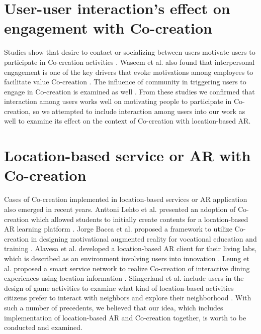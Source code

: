 \section{User-user interaction's effect on engagement with Co-creation}
Studies show that desire to contact or socializing between users motivate users to participate in Co-creation activities \cite{fernandes_remelhe_2016}\cite{engstrom_elg_2015}.
Waseem et al. also found that interpersonal engagement is one of the key drivers that evoke motivations among employees to facilitate value Co-creation \cite{waseem_biggemann_garry_2020}.
The influence of community in triggering users to engage in Co-creation is examined as well \cite{palma_trimi_hong_2018}\cite{zhang_kandampully_bilgihan_2015}.
From these studies we confirmed that interaction among users works well on motivating people to participate in Co-creation,
so we attempted to include interaction among users into our work as well to examine its effect on the context of Co-creation with location-based AR.

\section{Location-based service or AR with Co-creation}
Cases of Co-creation implemented in location-based services or AR application also emerged in recent years.
Anttoni Lehto et al. presented an adoption of Co-creation which allowed students to initially create contents for a location-based AR learning platform \cite{lehto_lautkankare_brander_alanissila_saari_salminen_2020}.
Jorge Bacca et al. proposed a framework to utilize Co-creation in designing motivational augmented reality for vocational education and training \cite{acosta_navarro_gesa_kinshuk_2019}.
Alavesa et al. developed a location-based AR client for their living labs, which is described as an environment involving users into innovation \cite{alavesa_2018}.
Leung et al. proposed a smart service network to realize Co-creation of interactive dining experiences using location information \cite{leung_loo_2020}.
Slingerland et al. include users in the design of game activities to examine what kind of location-based activities citizens prefer to interact with neighbors and explore their neighborhood \cite{slingerland_fonseca_lukosch_brazier_2020}.
With such a number of precedents, we believed that our idea, which includes implementation of location-based AR and Co-creation together, is worth to be conducted and examined.
